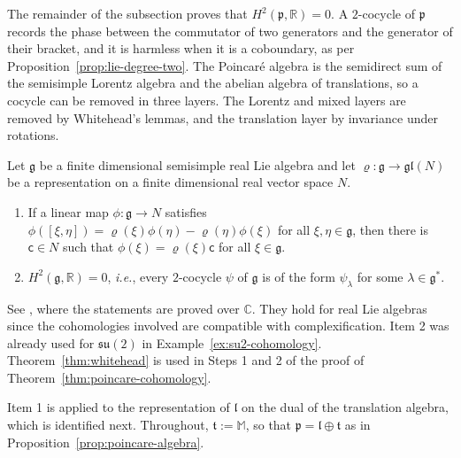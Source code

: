 The remainder of the subsection proves that $H^2(\mathfrak{p},\mathbb{R})=0$. A $2$-cocycle of $\mathfrak{p}$ records the phase between the commutator of two generators and the generator of their bracket, and it is harmless when it is a coboundary, as per Proposition~\ref{prop:lie-degree-two}. The Poincar\'e algebra is the semidirect sum of the semisimple Lorentz algebra and the abelian algebra of translations, so a cocycle can be removed in three layers. The Lorentz and mixed layers are removed by Whitehead's lemmas, and the translation layer by invariance under rotations.

\begin{theorem}\label{thm:whitehead}
	Let $\mathfrak{g}$ be a finite dimensional semisimple real Lie algebra and let $\varrho:\mathfrak{g}\to\mathfrak{gl}(N)$ be a representation on a finite dimensional real vector space $N$.
	\begin{enumerate}
		\item If a linear map $\phi:\mathfrak{g}\to N$ satisfies $\phi([\xi,\eta])=\varrho(\xi)\phi(\eta)-\varrho(\eta)\phi(\xi)$ for all $\xi,\eta\in\mathfrak{g}$, then there is $\mathsf{c}\in N$ such that $\phi(\xi)=\varrho(\xi)\mathsf{c}$ for all $\xi\in\mathfrak{g}$.
		\item $H^2(\mathfrak{g},\mathbb{R})=0$, \textit{i.e.}, every $2$-cocycle $\psi$ of $\mathfrak{g}$ is of the form $\psi_\lambda$ for some $\lambda\in\mathfrak{g}^*$.
	\end{enumerate}
\end{theorem}

\noindent See \cite[TODO-location]{TODO-Hum10}, where the statements are proved over $\mathbb{C}$. They hold for real Lie algebras since the cohomologies involved are compatible with complexification. Item 2 was already used for $\mathfrak{su}(2)$ in Example~\ref{ex:su2-cohomology}. Theorem~\ref{thm:whitehead} is used in Steps 1 and 2 of the proof of Theorem~\ref{thm:poincare-cohomology}.

Item 1 is applied to the representation of $\mathfrak{l}$ on the dual of the translation algebra, which is identified next. Throughout, $\mathfrak{t}:=\mathbb{M}$, so that $\mathfrak{p}=\mathfrak{l}\oplus\mathfrak{t}$ as in Proposition~\ref{prop:poincare-algebra}.

